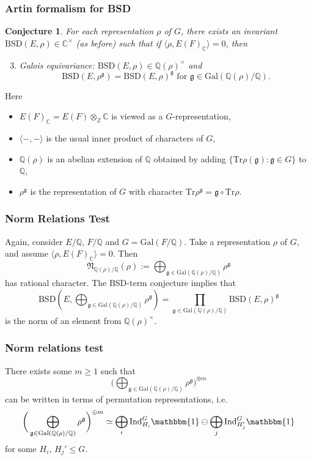 \documentclass{beamer}
\newcommand{\Gal}{\mathrm{Gal}}
\newcommand{\BSD}{\mathrm{BSD}}
\newcommand{\trivial}{\mathbbm{1}}
\newcommand{\Ind}{\mathrm{Ind}}
\newcommand{\Tr}{\mathrm{Tr}}
\newcommand{\CC}{\mathbb{C}}
\newcommand{\QQ}{\mathbb{Q}}
\newcommand{\fg}{\mathfrak{g}}
\newcommand{\bQ}{\mathbb{Q}}
\newcommand{\bC}{\mathbb{C}}
\newcommand{\bZ}{\mathbb{Z}}
\newcommand{\fN}{\mathfrak{N}}
\newcommand{\repnorm}[1]{\fN_{\bQ(#1) / \bQ}(#1)}
\theoremstyle{plain}
\newtheorem{conjecture}[thm]{Conjecture}
\begin{document}
\begin{frame}
    \frametitle{Artin formalism for BSD}
    \begin{conjecture}
        For each representation $\rho$ of $G$, there exists an invariant $\BSD(E, \rho) \in \CC^{\times}$ (as before)  such that if $\langle \rho, E(F)_{\CC} \rangle = 0$, then
        \begin{enumerate}\setcounter{enumi}{2}
            \item Galois equivariance: $\BSD(E, \rho) \in \QQ(\rho)^{\times}$ and $$\BSD(E, \rho^{\mathfrak{g}}) = \BSD(E, \rho)^{\mathfrak{g}} \text{ for } \mathfrak{g} \in \Gal(\bQ(\rho) / \bQ).$$ 
        \end{enumerate}
    
    \end{conjecture}
    \pause
    Here 
    \begin{itemize}
        \item $E(F)_{\bC} = E(F) \otimes_{\bZ} \bC$ is viewed as a $G$-representation, \pause
        \item $\langle -, - \rangle$ is the usual inner product of characters of $G$, \pause
       \item $\bQ(\rho)$ is an abelian extension of $\bQ$ obtained by adding $\{ \Tr \rho(\fg) \colon \fg \in G \}$ to $\bQ$, \pause
        \item $\rho^{\fg}$ is the representation of $G$ with character $\Tr \rho^{\fg} = \fg \circ \Tr \rho $.
    \end{itemize}

\end{frame}

\begin{frame}
    \frametitle{Norm Relations Test}
    Again, consider $E/ \bQ$, $F / \bQ$ and $G = \Gal(F / \bQ)$. \pause Take a representation $\rho$ of $G$, and assume $\langle \rho, E(F)_{\bC} \rangle = 0$. Then 
    $$ \repnorm{\rho} := \bigoplus_{\fg \in \Gal(\bQ(\rho) / \bQ)} \rho^{\fg}$$
    has rational character. \pause 
    The BSD-term conjecture implies that
    $$\BSD(E, \bigoplus_{\fg \in \Gal(\bQ(\rho) / \bQ)} \rho^{\fg}) = \prod_{\fg \in \Gal(\bQ(\rho) / \bQ)} \BSD(E, \rho)^{\fg}$$\pause
    is the norm of an element from $\bQ(\rho)^{\times}$. 
\end{frame}

\begin{frame}
    \frametitle{Norm relations test}
    There exists some $m \geq 1$ such that $$\bigg(\bigoplus_{\fg \in \Gal(\bQ(\rho) / \bQ)} \rho^{\fg}\bigg)^{\oplus m}$$
    can be written in terms of permutation representations, i.e. \pause
    $$  \bigg(\bigoplus_{\fg \in \Gal(\bQ(\rho) / \bQ)} \rho^{\fg}\bigg)^{\oplus m} \simeq \bigoplus_{i} \Ind_{H_i}^G \trivial \ominus \bigoplus_{j} \Ind_{H_j'}^G \trivial$$
    for some $H_i$, $H_j' \leq G$. 
\end{frame}
\end{document}

